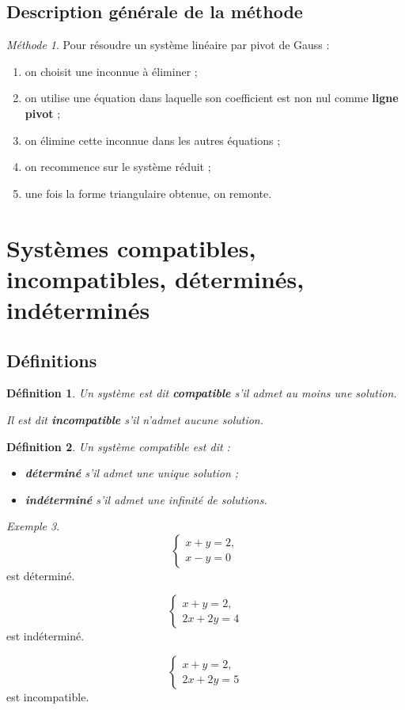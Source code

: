 \documentclass[11pt,a4paper]{article}
\newtheorem{definition}{Définition}[section]
\theoremstyle{remark}
\newtheorem{exemple}[definition]{Exemple}
\newtheorem*{methode}{Méthode}
\begin{document}
\subsection{Description générale de la méthode}

\begin{methode}
Pour résoudre un système linéaire par pivot de Gauss :
\begin{enumerate}
    \item on choisit une inconnue à éliminer ;
    \item on utilise une équation dans laquelle son coefficient est non nul comme \textbf{ligne pivot} ;
    \item on élimine cette inconnue dans les autres équations ;
    \item on recommence sur le système réduit ;
    \item une fois la forme triangulaire obtenue, on remonte.
\end{enumerate}
\end{methode}

\section{Systèmes compatibles, incompatibles, déterminés, indéterminés}

\subsection{Définitions}

\begin{definition}
Un système est dit \textbf{compatible} s’il admet au moins une solution.

Il est dit \textbf{incompatible} s’il n’admet aucune solution.
\end{definition}

\begin{definition}
Un système compatible est dit :
\begin{itemize}
    \item \textbf{déterminé} s’il admet une unique solution ;
    \item \textbf{indéterminé} s’il admet une infinité de solutions.
\end{itemize}
\end{definition}

\begin{exemple}
\[
\begin{cases}
x+y=2,\\
x-y=0
\end{cases}
\]
est déterminé.

\[
\begin{cases}
x+y=2,\\
2x+2y=4
\end{cases}
\]
est indéterminé.

\[
\begin{cases}
x+y=2,\\
2x+2y=5
\end{cases}
\]
est incompatible.
\end{exemple}
\end{document}
